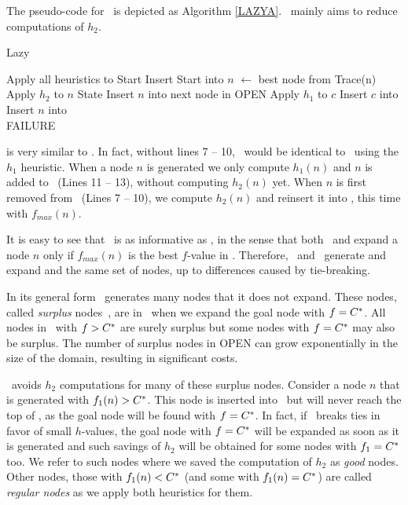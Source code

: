 The pseudo-code for  \lazyastar~is depicted as Algorithm \ref{LAZYA}.
\lazyastar~mainly aims to reduce computations of $h_2$.
\begin{algorithm}[h]
\caption{Lazy \astar}
\begin{algorithmic}[1]
    \State Apply all heuristics to Start
    \State Insert Start into \OPEN
        \State $n$ $\gets$ best node from \OPEN
            \Return Trace(n)
        \EndIf
            \State Apply $h_2$ to $n$
            State Insert $n$ into \OPEN
			 \Comment next node in OPEN
        \EndIf
            \State Apply $h_1$ to $c$
            \State Insert $c$ into \OPEN
        \EndFor
        \State Insert $n$ into \CLOSED
    \EndWhile  \\
    \Return FAILURE
\EndProcedure
\end{algorithmic}
\label{LAZYA}
\end{algorithm}
\lazyastar is very similar to \astar.
In fact, without lines 7 -- 10, \lazyastar~would be identical to
\astar~using the $h_1$ heuristic.
When a node $n$ is generated we only compute $h_1(n)$ and $n$ is added to
\OPEN ~(Lines 11 -- 13), without computing $h_2(n)$ yet.
When $n$ is first removed from \OPEN~(Lines 7 -- 10), we compute $h_2(n)$ and
reinsert it into \OPEN, this time with $f_{max}(n)$.

It is easy to see that \lazyastar~is as informative as \astarmax, in
the sense that both \astarmax~and \lazyastar expand a node $n$ only
if $f_{max}(n)$ is the best $f$-value in \OPEN.  Therefore,
\lazyastar~and \astarmax~generate and expand and the same set of
nodes, up to differences caused by tie-breaking.

In its general form \astar~generates many nodes that it does not expand. These
nodes, called {\em surplus} nodes~\cite{Felner2012}, are in \OPEN~when we
expand the goal node with $f=C^\ast$. All nodes in \OPEN~with $f>C^\ast$ are
surely surplus but some nodes with $f=C^\ast$ may also be surplus. The number
of surplus nodes in OPEN can grow exponentially in the size of the domain, resulting in
significant costs.

\lazyastar~avoids $h_2$ computations for many of these surplus nodes. Consider
a node $n$ that is generated with $f_1(n) > C^\ast$. This node is inserted
into \OPEN~but will never reach the top of \OPEN, as the goal node will be found
with $f=C^\ast$. In fact, if \OPEN~breaks ties in favor of small $h$-values,
the goal node with $f=C^\ast$ will be expanded as soon as it is generated and such
savings of $h_2$ will be obtained for some nodes with $f_1=C^\ast$ too. We
refer to such nodes where we saved the computation of $h_2$ as {\em good} nodes. Other nodes,
those with $f_1(n) < C^\ast$ (and some with $f_1(n) = C^\ast$) are called
{\em regular nodes} as we apply both heuristics for them.

